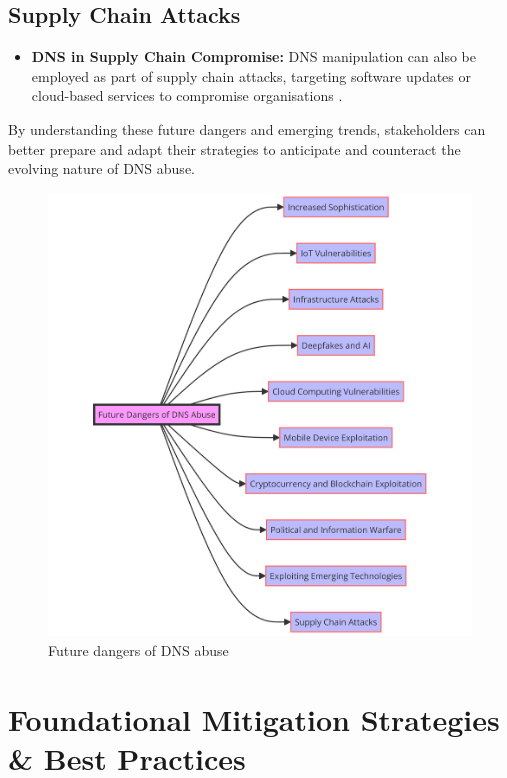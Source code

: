 \subsection{Supply Chain Attacks}
\begin{itemize}
    \item \textbf{DNS in Supply Chain Compromise:} DNS manipulation can also be employed as part of supply chain attacks, targeting software updates or cloud-based services to compromise organisations \cite{boyson2014cyber}.
\end{itemize}

By understanding these future dangers and emerging trends, stakeholders can better prepare and adapt their strategies to anticipate and counteract the evolving nature of DNS abuse.


\captionsetup{font= footnotesize}
\begin{figure}[H]
\centering
\includegraphics[width=1.2\textwidth]{background/DNSfutureDanger.png}
\caption{Future dangers of DNS abuse}
\label{fig:figureFive}
\end{figure}
\newpage


\section{Foundational Mitigation Strategies \& Best Practices }

